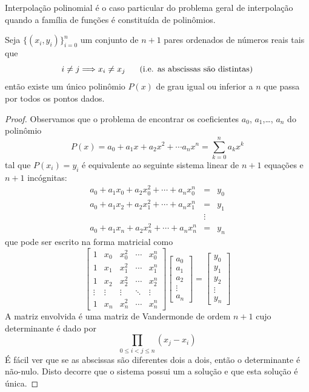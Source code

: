 Interpolação polinomial é o caso particular do problema geral de interpolação quando a família de funções é constituída de polinômios.
\begin{teo}\label{teo_interp_poli} Seja $\{(x_i,y_i)\}_{i=0}^{n}$ um conjunto de $n+1$ pares ordenados de números reais tais que $$i\neq j \Longrightarrow x_i\neq x_j~~~~\hbox{ (i.e. as abscissas são distintas)}$$
então existe um único polinômio $P(x)$ de grau igual ou inferior a $n$ que passa por todos os pontos dados.
\end{teo}
\begin{proof} Observamos que o problema de encontrar os coeficientes $a_0$, $a_1$,\ldots, $a_n$ do polinômio
$$P(x)=a_0+a_1x+a_2x^2+\cdots a_n x^n=\sum_{k=0}^n a_k x^k$$
tal que $P(x_i)=y_i$ é equivalente ao seguinte sistema linear de $n+1$ equações e $n+1$ incógnitas:
\begin{eqnarray*}
a_0+a_1x_0+a_2x_0^2+\cdots +a_n x_0^n&=&y_0\\
a_0+a_1x_2+a_2x_1^2+\cdots +a_n x_1^n&=&y_1\\
&\vdots&\\
a_0+a_1x_n+a_2x_n^2+\cdots +a_n x_n^n&=&y_n
\end{eqnarray*}
que pode ser escrito na forma matricial como
$$\left[
\begin{array}{ccccc}
1 & x_0 & x_0^2 & \cdots & x_0^n\\
1 & x_1 & x_1^2 & \cdots & x_1^n\\
1 & x_2 & x_2^2 & \cdots & x_2^n\\
\vdots&\vdots&\vdots&\ddots&\vdots\\
1 & x_n & x_n^2 & \cdots & x_n^n
\end{array}
\right]
\left[
\begin{array}{c}
a_0\\a_1\\a_2\\ \vdots \\a_n
\end{array}
\right]=
\left[
\begin{array}{c}
y_0\\y_1\\y_2\\ \vdots \\y_n
\end{array}
\right]
$$
A matriz envolvida é uma matriz de Vandermonde de ordem $n+1$ cujo determinante é dado por
$$\prod_{0\leq i<j\leq n}\left(x_j-x_i\right)$$
É fácil ver que se as abscissas são diferentes dois a dois, então o determinante é não-nulo. Disto decorre que o sistema possui um a solução e que esta solução é única.
\end{proof}

